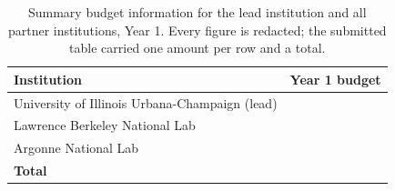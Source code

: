 \begin{table}[H]
  \centering\footnotesize
  \caption{Summary budget information for the lead institution and all partner
  institutions, Year 1. Every figure is redacted; the submitted table carried
  one amount per row and a total.}
  \label{tab:budget}
  \begin{tabular}{L{70mm}L{40mm}}
    \toprule
    \textbf{Institution} & \textbf{Year 1 budget} \\
    \midrule
    University of Illinois Urbana-Champaign (lead) &  \\
    Lawrence Berkeley National Lab &  \\
    Argonne National Lab &  \\
    \textbf{Total} &  \\
    \bottomrule
  \end{tabular}
\end{table}
